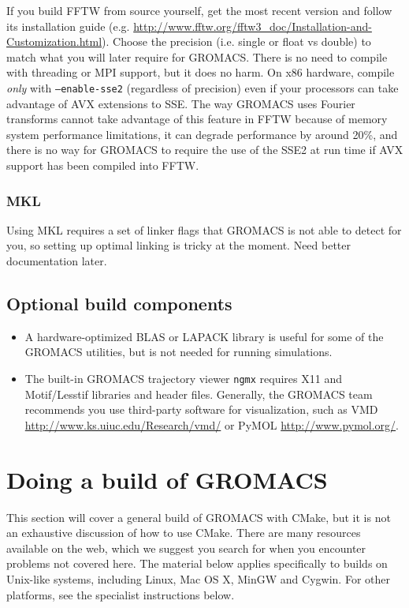 \documentclass{article}[12pt,a4paper,twoside]
\newcommand{\gromacs}{GROMACS}
\newcommand{\fftw}{FFTW}
\newcommand{\mkl}{MKL}
\newcommand{\mpi}{MPI}
\newcommand{\cmake}{CMake}
\newcommand{\sse}{SSE}
\newcommand{\ssetwo}{SSE2}
\newcommand{\avx}{AVX}
\newcommand{\blas}{BLAS}
\newcommand{\lapack}{LAPACK}
\newcommand{\vmd}{VMD}
\newcommand{\pymol}{PyMOL}
\begin{document}
If you build \fftw{} from source yourself, get the most recent version
and follow its installation guide
(e.g. \url{http://www.fftw.org/fftw3_doc/Installation-and-Customization.html}). Choose
the precision (i.e. single or float vs double) to match what you will
later require for \gromacs{}. There is no need to compile with
threading or \mpi{} support, but it does no harm. On x86 hardware,
compile \emph{only} with \texttt{--enable-sse2} (regardless of
precision) even if your processors can take advantage of \avx{}
extensions to \sse{}. The way \gromacs{} uses Fourier transforms
cannot take advantage of this feature in \fftw{} because of memory
system performance limitations, it can degrade performance by around
20\%, and there is no way for \gromacs{} to require the use of the
\ssetwo{} at run time if \avx{} support has been compiled into \fftw{}.

\subsubsection{\mkl{}}

Using \mkl{} requires a set of linker flags that \gromacs{} is not
able to detect for you, so setting up optimal linking is tricky at the
moment. Need better documentation later.

\subsection{Optional build components}

\begin{itemize}
\item A hardware-optimized \blas{} or \lapack{} library is useful for
  some of the \gromacs{} utilities, but is not needed for running
  simulations.
\item The built-in \gromacs{} trajectory viewer \texttt{ngmx} requires
  X11 and Motif/Lesstif libraries and header files. Generally, the
  \gromacs{} team recommends you use third-party software for
  visualization, such as \vmd{}
  \url{http://www.ks.uiuc.edu/Research/vmd/} or \pymol{}
  \url{http://www.pymol.org/}.
\end{itemize}

\section{Doing a build of \gromacs}

This section will cover a general build of \gromacs{} with \cmake{},
but it is not an exhaustive discussion of how to use \cmake{}. There
are many resources available on the web, which we suggest you search
for when you encounter problems not covered here. The material below
applies specifically to builds on Unix-like systems, including Linux,
Mac OS X, MinGW and Cygwin. For other platforms, see the specialist
instructions below.
\end{document}
